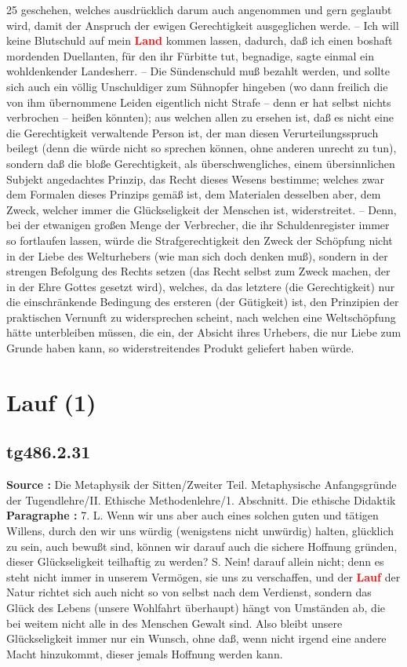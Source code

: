 \documentclass[a4paper,12pt,twoside]{book}
\newcommand{\match}[1]{\textcolor{red}{\textbf{#1}}}
\newcommand{\unnumberedsection}[1]{
	\section*{#1}
	\addcontentsline{toc}{section}{#1}
	\markright{#1}
}
\begin{document}
	
	25
	geschehen, welches ausdrücklich darum auch angenommen und gern geglaubt wird, damit der Anspruch der ewigen Gerechtigkeit ausgeglichen werde. – Ich will keine Blutschuld auf mein \match{Land} kommen lassen, dadurch, daß ich einen boshaft mordenden Duellanten, für den ihr Fürbitte tut, begnadige, sagte einmal ein wohldenkender Landesherr. – Die Sündenschuld muß bezahlt werden, und sollte sich auch ein völlig Unschuldiger zum Sühnopfer  hingeben (wo dann freilich die von ihm übernommene Leiden eigentlich nicht Strafe – denn er hat selbst nichts verbrochen – heißen könnten); aus welchen allen zu ersehen ist, daß es nicht eine die Gerechtigkeit verwaltende Person ist, der man diesen Verurteilungsspruch beilegt (denn die würde nicht so sprechen können, ohne anderen unrecht zu tun), sondern daß die bloße Gerechtigkeit, als überschwengliches, einem übersinnlichen Subjekt angedachtes Prinzip, das Recht dieses Wesens bestimme; welches zwar dem Formalen dieses Prinzips gemäß ist, dem Materialen desselben aber, dem Zweck, welcher immer die Glückseligkeit der Menschen ist, widerstreitet. – Denn, bei der etwanigen großen Menge der Verbrecher, die ihr Schuldenregister immer so fortlaufen lassen, würde die Strafgerechtigkeit den Zweck der Schöpfung nicht in der Liebe des Welturhebers (wie man sich doch denken muß), sondern in der strengen Befolgung des Rechts setzen (das Recht selbst zum Zweck machen, der in der Ehre Gottes gesetzt wird), welches, da das letztere (die Gerechtigkeit) nur die einschränkende Bedingung des ersteren (der Gütigkeit) ist, den Prinzipien der praktischen Vernunft zu widersprechen scheint, nach welchen eine Weltschöpfung hätte unterbleiben müssen, die ein, der Absicht ihres Urhebers, die nur Liebe zum Grunde haben kann, so widerstreitendes Produkt geliefert haben würde. 
	
	\unnumberedsection{Lauf (1)} 
	\subsection*{tg486.2.31} 
	\textbf{Source : }Die Metaphysik der Sitten/Zweiter Teil. Metaphysische Anfangsgründe der Tugendlehre/II. Ethische Methodenlehre/1. Abschnitt. Die ethische Didaktik\\  
	
	\textbf{Paragraphe : }7. L. Wenn wir uns aber auch eines solchen guten und tätigen Willens, durch den wir uns würdig (wenigstens nicht unwürdig) halten, glücklich zu sein, auch bewußt sind, können wir darauf auch die sichere Hoffnung gründen, dieser Glückseligkeit teilhaftig zu werden? S. Nein! darauf allein nicht; denn es steht nicht immer in unserem Vermögen, sie uns zu verschaffen, und der \match{Lauf} der Natur richtet sich auch nicht so von selbst nach dem Verdienst, sondern das Glück des Lebens (unsere Wohlfahrt überhaupt) hängt von Umständen ab, die bei weitem nicht alle in des Menschen Gewalt sind. Also bleibt unsere Glückseligkeit immer nur ein Wunsch, ohne daß, wenn nicht irgend eine andere Macht hinzukommt, dieser jemals Hoffnung werden kann. 
	
\end{document}
